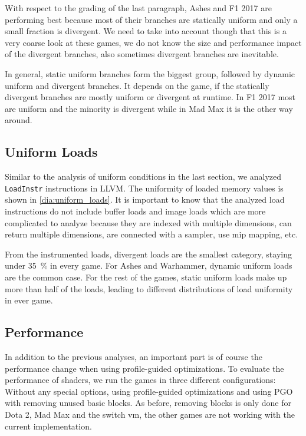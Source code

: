 With respect to the grading of the last paragraph, Ashes and F1 2017 are performing best because most of their branches are statically uniform and only a small fraction is divergent.
We need to take into account though that this is a very coarse look at these games, we do not know the size and performance impact of the divergent branches, also sometimes divergent branches are inevitable.

In general, static uniform branches form the biggest group, followed by dynamic uniform and divergent branches.
It depends on the game, if the statically divergent branches are mostly uniform or divergent at runtime.
In F1 2017 most are uniform and the minority is divergent while in Mad Max it is the other way around.

\subsection{Uniform Loads}
\label{sub:eval_uniform_loads}
Similar to the analysis of uniform conditions in the last section, we analyzed \texttt{LoadInstr} instructions in LLVM.
The uniformity of loaded memory values is shown in \cref{dia:uniform_loads}.
It is important to know that the analyzed load instructions do not include buffer loads and image loads which are more complicated to analyze because they are indexed with multiple dimensions, can return multiple dimensions, are connected with a sampler, use mip mapping, etc.


From the instrumented loads, divergent loads are the smallest category, staying under \SI{35}{\percent} in every game.
For Ashes and Warhammer, dynamic uniform loads are the common case. For the rest of the games, static uniform loads make up more than half of the loads, leading to different distributions of load uniformity in ever game.

\subsection{Performance}
\label{sub:eval_perf}
In addition to the previous analyses, an important part is of course the performance change when using profile-guided optimizations.
To evaluate the performance of shaders, we run the games in three different configurations: Without any special options, using profile-guided optimizations and using PGO with removing unused basic blocks.
As before, removing blocks is only done for Dota 2, Mad Max and the switch vm, the other games are not working with the current implementation.


